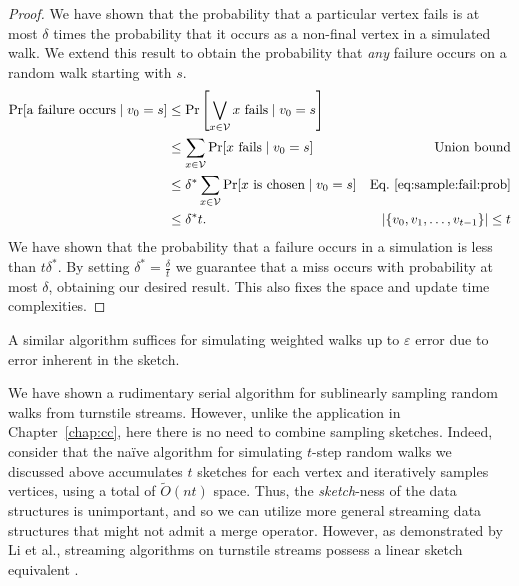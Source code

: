 \documentclass[10]{report}
\newcommand{\E}{\mathbb{E}}
\begin{document}
\begin{proof}
We have shown that the probability that a particular vertex fails is at most $\delta$ times the probability that it occurs as a non-final vertex in a simulated walk.
We extend this result to obtain the probability that \emph{any} failure occurs on a random walk starting with $s$.
%
\begin{align*}
\Pr [\textnormal{a failure occurs} \mid v_0 = s]
&\leq 
\Pr \left [ \bigvee_{x \in \mathcal{V}} \textnormal{$x$ fails} \mid v_0 = s \right ]
&\\
&\leq
\sum_{x \in \mathcal{V}} \Pr [\textnormal{$x$ fails} \mid v_0 = s ] 
& \textnormal{Union bound}\\
&\leq
\delta^* \sum_{x \in \mathcal{V}} \Pr [\textnormal{$x$ is chosen} \mid v_0 = s ] 
& \textnormal{Eq.~\ref{eq:sample:fail:prob}}\\
&\leq
\delta^* t.
& |\{v_0, v_1, \dots, v_{t-1} \}| \leq t
\end{align*}
We have shown that the probability that a failure occurs in a simulation is less than $t\delta^*$.
By setting $\delta^* = \frac{\delta}{t}$ we guarantee that a miss occurs with probability at most $\delta$, obtaining our desired result.
This also fixes the space and update time complexities.
\end{proof}

A similar algorithm suffices for simulating weighted walks up to $\varepsilon$ error due to error inherent in the sketch.


We have shown a rudimentary serial algorithm for sublinearly sampling random walks from turnstile streams.
However, unlike the application in Chapter~\ref{chap:cc}, here there is no need to combine sampling sketches. 
Indeed, consider that the na\"ive algorithm for simulating $t$-step random walks we discussed above accumulates $t$ sketches for each vertex and iteratively samples vertices, using a total of $\widetilde{O}(nt)$ space.
Thus, the \emph{sketch}-ness of the data structures is unimportant, and so we can utilize more general streaming data structures that might not admit a merge operator.
However, as demonstrated by Li et al., streaming algorithms on turnstile streams possess a linear sketch equivalent \cite{li2014turnstile}. 
\end{document}
